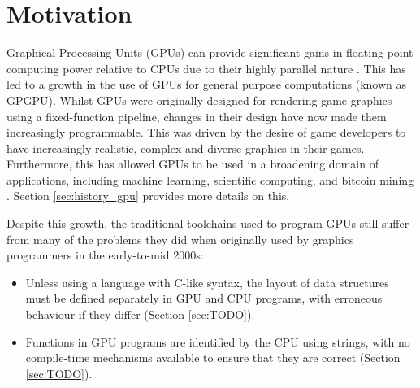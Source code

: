 \documentclass[a4paper,12pt,twoside,openright]{report}
\begin{document}
\section{Motivation}




Graphical Processing Units (GPUs) can provide significant gains in
floating-point computing power relative to CPUs due to their highly parallel
nature \cite{CPUGPUOverTime}. This has led to a growth in the use of GPUs for
general purpose computations (known as GPGPU). Whilst GPUs were originally
designed for rendering game graphics using a fixed-function pipeline, changes
in their design have now made them increasingly programmable. This was driven
by the desire of game developers to have increasingly realistic, complex and
diverse graphics in their games. Furthermore, this has allowed GPUs to be used
in a broadening domain of applications, including machine learning, scientific
computing, and bitcoin mining \cite{GPUCrypto} \cite{GPUScientificComputing}
\cite{GPUAI}. Section \ref{sec:history_gpu} provides more details on this.


Despite this growth, the traditional toolchains used to program GPUs still
suffer from many of the problems they did when originally used by graphics
programmers in the early-to-mid 2000s:

\begin{itemize}

    \item Unless using a language with C-like syntax, the layout of data
    structures must be defined separately in GPU and CPU programs, with
    erroneous behaviour if they differ (Section \ref{sec:TODO}).

    \item Functions in GPU programs are identified by the CPU using strings,
    with no compile-time mechanisms available to ensure that they are correct
    (Section \ref{sec:TODO}).


\end{itemize}
\end{document}
